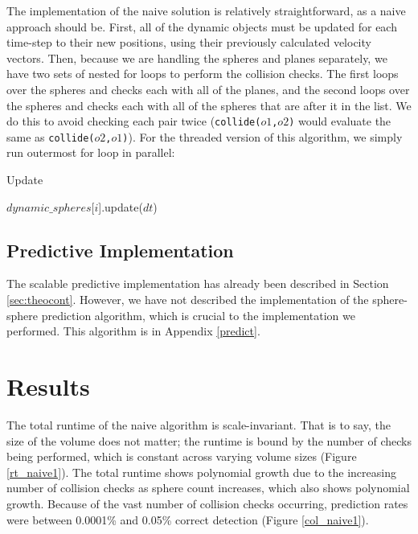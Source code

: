 \documentclass[CEJCS,PDF]{cej} %
\begin{document}
The implementation of the naive solution is relatively straightforward, as a naive approach should be.  First, all of the dynamic objects must be updated for each time-step to their new positions, using their previously calculated velocity vectors.  Then, because we are handling the spheres and planes separately, we have two sets of nested for loops to perform the collision checks.  The first loops over the spheres and checks each with all of the planes, and the second loops over the spheres and checks each with all of the spheres that are after it in the list.  We do this to avoid checking each pair twice (\texttt{collide($o1$,$o2$)} would evaluate the same as \texttt{collide($o2$,$o1$)}). For the threaded version of this algorithm, we simply run outermost for loop in parallel:

\begin{algorithm}
\caption{Update}
\begin{algorithmic}
	\STATE $dynamic\_spheres$[$i$].update($dt$)
\ENDFOR
\end{algorithmic}
\end{algorithm}

\subsection{Predictive Implementation}

The scalable predictive implementation has already been described in Section \ref{sec:theocont}.  However, we have not described the implementation of the sphere-sphere prediction algorithm, which is crucial to the 
implementation we performed.  This algorithm is in Appendix \ref{predict}.

\section{Results} 
\label{results}
The total runtime of the naive algorithm is scale-invariant.  That is to say, the size of the volume does not matter; the runtime is bound by the number of checks being performed, which is constant across varying volume sizes (Figure \ref{rt_naive1}).  The total runtime shows polynomial growth due to the increasing number of collision checks as sphere count increases, which also shows polynomial growth.  Because of the vast number of collision checks occurring, prediction rates were between 0.0001\% and 0.05\% correct detection (Figure \ref{col_naive1}).
\end{document}
